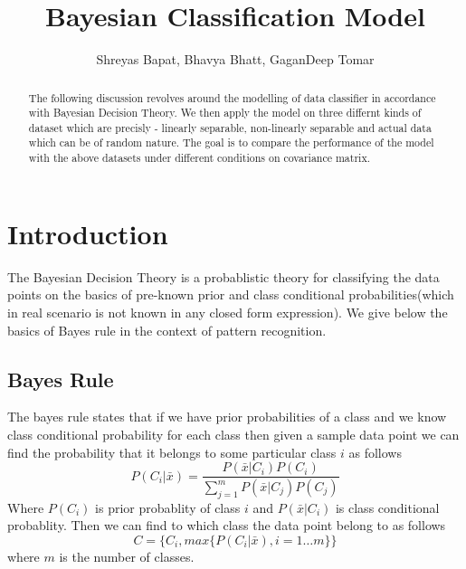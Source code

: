 \documentclass[a4paper]{article}
\title{Bayesian Classification Model}
\author{Shreyas Bapat, Bhavya Bhatt, GaganDeep Tomar}
\begin{document}
\maketitle

\begin{abstract}
The following discussion revolves around the modelling of data classifier in accordance with Bayesian Decision Theory. We then apply the model on three differnt kinds of dataset which are precisly - linearly separable, non-linearly separable and actual data which can be of random nature. The goal is to compare the performance of the model with the above datasets under different conditions on covariance matrix.   
\end{abstract}

\section{Introduction}

The Bayesian Decision Theory is a probablistic theory for classifying the data points on the basics of pre-known prior and class conditional probabilities(which in real scenario is not known in any closed form expression). We give below the basics of Bayes rule in the context of pattern recognition.
\subsection{Bayes Rule}
The bayes rule states that if we have prior probabilities of a class and we know class conditional probability for each class then given a sample data point we can find the probability that it belongs to some particular class $i$ as follows
\begin{equation}\label{bayes equation}
P(C_{i}|\bar{x}) = \frac{P(\bar{x}|C_{i})P(C_{i})}{\sum_{j=1}^{m}P(\bar{x}|C_{j})P(C_{j})}
\end{equation} Where $P(C_{i})$ is prior probablity of class $i$ and $P(\bar{x}|C_{i})$ is class conditional probablity. Then we can find to which class the data point belong to as follows
\begin{equation}
C = \{C_{i}, max\{P(C_{i}|\bar{x}), i=1\dots m\}\}
\end{equation} where $m$ is the number of classes.
\end{document}
